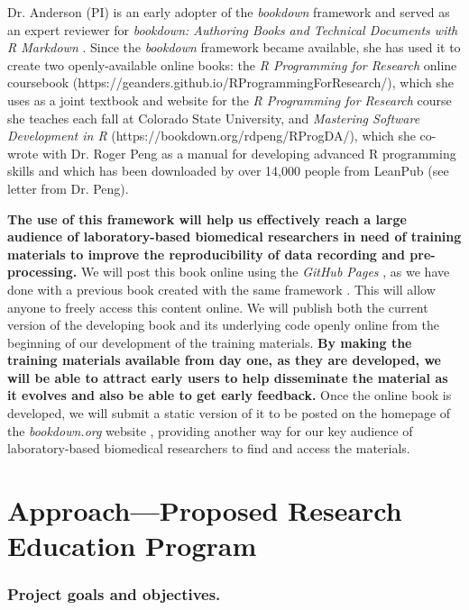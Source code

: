 \documentclass[pdftex,english,11pt,parskip=half]{scrartcl}
\begin{document}
Dr. Anderson (PI) is an early adopter of the \textit{bookdown} framework and served as an expert reviewer for \textit{bookdown: Authoring Books
and Technical Documents with R Markdown} \cite{xie2016bookdown}. Since
the \textit{bookdown} framework became available, she has used it to create two openly-available online
books: the \textit{R Programming for Research} online coursebook (https://geanders.github.io/RProgrammingForResearch/), which she uses
as a joint textbook and website for the \textit{R Programming for Research}
course she teaches each fall at Colorado State University, and \textit{Mastering
Software Development in R} (https://bookdown.org/rdpeng/RProgDA/), which she co-wrote with Dr. Roger Peng as a manual
for developing advanced R programming skills and which has been downloaded by
over 14,000 people from LeanPub (see letter from Dr. Peng). 

\textbf{The use of this framework will help us effectively reach a large
audience of laboratory-based biomedical researchers in need of training materials to improve the reproducibility of data
recording and pre-processing.} We will 
post this book online using the \textit{GitHub Pages} \cite{gitpages}, as we have done
with a previous book created with the same framework \cite{andersoncoursebook}. This will allow anyone to
freely access this content online. We will publish both the current version of the developing book and its underlying code openly online from the beginning
of our development of the training materials. \textbf{By making the training
materials available from day one, as they are developed, we will be able to
attract early users to help disseminate the material as it evolves and also be
able to get early feedback.} Once the online
book is developed, we will submit a static version of it to be posted
on the homepage of the \textit{bookdown.org} website \cite{bookdownorg}, providing
another way for our key audience of laboratory-based biomedical researchers to find and access the materials.

\section{Approach---Proposed Research Education Program}

\subsubsection*{Project goals and objectives.} 
\end{document}
